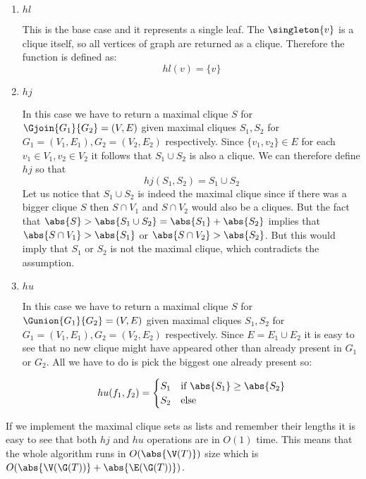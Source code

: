 \begin{enumerate}
    \item $hl$

          This is the base case and it represents a single leaf. The $\singleton{v}$ is a clique itself, so all vertices of graph are returned as a clique. Therefore the function is defined as:
          \[
              hl(v) = \{v\}
          \]

    \item $hj$

          In this case we have to return a maximal clique $S$ for $\Gjoin{G_1}{G_2} = (V,E)$ given maximal cliques $S_1,S_2$ for $G_1 = (V_1, E_1), G_2 = (V_2, E_2)$ respectively. Since $\{v_1, v_2\} \in E$ for each $v_1 \in V_1, v_2 \in V_2$ it follows that $S_1 \cup S_2$ is also a clique. We can therefore define $hj$ so that
          \[
              hj(S_1, S_2) = S_1 \cup S_2
          \]
          Let us notice that $S_1 \cup S_2$ is indeed the maximal clique since if there was a bigger clique $S$ then $S \cap V_1$ and $S \cap V_2$ would also be a cliques. But the fact that $\abs{S} > \abs{S_1 \cup S_2} = \abs{S_1} + \abs{S_2}$ implies that $\abs{S \cap V_1} > \abs{S_1}$ or $\abs{S \cap V_2} > \abs{S_2}$. But this would imply that $S_1$ or $S_2$ is not the maximal clique, which contradicts the assumption.

    \item $hu$

          In this case we have to return a maximal clique $S$ for $\Gunion{G_1}{G_2} = (V,E)$ given maximal cliques $S_1,S_2$ for $G_1 = (V_1, E_1), G_2 = (V_2, E_2)$ respectively. Since $E = E_1 \cup E_2$ it is easy to see that no new clique might have appeared other than already present in $G_1$ or $G_2$. All we have to do is pick the biggest one already present so:

          \[
              hu(f_1, f_2) = \begin{cases}
                  S_1 & \text{if } \abs{S_1} \geq \abs{S_2} \\
                  S_2 & \text{else}
              \end{cases}
          \]
\end{enumerate}

If we implement the maximal clique sets as lists and remember their lengths it is easy to see that both $hj$ and $hu$ operations are in $O(1)$ time. This means that the whole algorithm runs in $O(\abs{\V(T)})$ size which is $O(\abs{\V(\G(T))} + \abs{\E(\G(T))})$.
